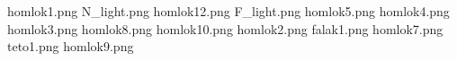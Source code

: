 homlok1.png
N_light.png
homlok12.png
F_light.png
homlok5.png
homlok4.png
homlok3.png
homlok8.png
homlok10.png
homlok2.png
falak1.png
homlok7.png
teto1.png
homlok9.png
